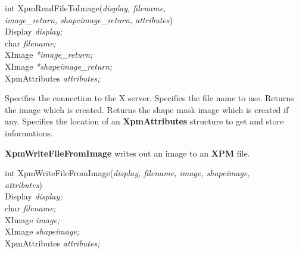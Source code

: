 \begin{flushleft} 

int XpmReadFileToImage({\it display, filename, \\
\hspace{3cm}image\_return, shapeimage\_return, attributes})\\

\hspace{1cm}Display {\it *display;}\\
\hspace{1cm}char {\it *filename;}\\
\hspace{1cm}XImage {\it **image\_return;}\\
\hspace{1cm}XImage {\it **shapeimage\_return;}\\
\hspace{1cm}XpmAttributes {\it *attributes;}

\end{flushleft}

\begin{description}

 Specifies the connection to the X server.
 Specifies the file name to use.
 Returns the image which is created.
 Returns the shape mask image which is created if
any.
 Specifies the location of an {\bf XpmAttributes} structure
to get and store informations.

\end{description} 

\vspace{.5cm}
{\bf XpmWriteFileFromImage} writes out an image to an {\bf XPM} file.

\begin{flushleft} 

int XpmWriteFileFromImage({\it display, filename, image, shapeimage,\\
\hspace{3cm}attributes})\\

\hspace{1cm}Display {\it *display;}\\
\hspace{1cm}char {\it *filename;}\\
\hspace{1cm}XImage {\it *image;}\\
\hspace{1cm}XImage {\it *shapeimage;}\\
\hspace{1cm}XpmAttributes {\it *attributes;}

\end{flushleft}

